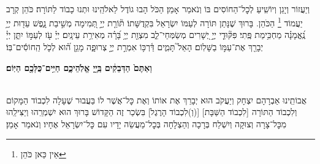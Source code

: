 \documentclass[twoside, openany, parskip=half, 11pt]{book}
\begin{document}
\avharachamim

\\
וְיַעֲזוֹר וְיָגֵן וְיוֹשִֽׁיעַ לְכׇל־הַחוֹסִים בּוֹ וְנֹאמַר אָמֵן׃
הַכֹּל הָבוּ גוֹדֶל לֵאלֹהֵֽינוּ וּתְנוּ כָבוֹד לַתּוֹרָה׃ כֹּהֵן קְרָב יַעֲמוֹד
\footnote{ אֵין כַּאן כֹּהֵן}
הַכֹּהֵן. בָּרוּךְ שֶׁנָּתַן תּוֹרָה לְעַמּוֹ יִשְׂרָאֵל בִּקְדֻשָּׁתוֹ׃
תּ֘וֹרַ֤ת יְיָ֣ תְּ֭מִימָה מְשִׁ֣יבַת נָ֑פֶשׁ עֵד֖וּת יְיָ֥ נֶֽ֝אֱמָנָ֗ה מַחְכִּ֥ימַת פֶּֽתִי׃ פִּקּ֘וּדֵ֤י יְיָ֣ יְ֭שָׁרִים מְשַׂמְּחֵי־לֵ֑ב מִצְוַ֖ת יְיָ֥ בָּ֝רָ֗ה מְאִירַ֥ת עֵינָֽיִם׃
יְיָ֗ עֹ֖ז לְעַמּ֣וֹ יִתֵּ֑ן יְיָ֓ יְבָרֵ֖ךְ אֶת־עַמּ֣וֹ בַשָּׁלֽוֹם׃
הָאֵל֮ תָּמִ֢ים דַּ֫רְכּ֥וֹ אִמְרַ֣ת יְיָ֣ צְרוּפָ֑ה מָגֵ֥ן ה֝֗וּא לְכֹ֤ל הַֽחוֹסִ֬ים־בּֽוֹ׃


\textbf{וְאַתֶּם֙ הַדְּבֵקִ֔ים בַּֽיְ֖יָ אֱלֹֽהֵיכֶ֑ם חַיִּ֥ים־כֻּלְּכֶ֖ם הַיּֽוֹם׃} 

\nextpage

\torahbarachu

\hagomel

\\
אֲבוֹתֵֽינוּ אַבְרָהָם יִצְחָק וְיַעֲקֹב הוּא יְבָרֵךְ אֶת
אוֹתוֹ וְאֶת כׇּל־אֲשֶׁר לוֹ
בַּעֲבוּר שֶׁעָלָה לִכְבוֹד הַמָּקוֹם וְלִכְבוֹד הַתּוֹרָה
[לִכְבוֹד הַשַּׁבָּת]
[(וְ)לִכְבוֹד הָרֶגֶל]
בִּשְׂכַר זֶה הַקָּדוֹשׁ בָּרוּךְ הוּא יִשְׁמְרֵֽהוּ וְיַצִּילֵֽהוּ מִכׇּל־צָרָה וְצוּקָה וְיִשְׁלַח בְּרָכָה וְהַצְלָחָה בְּכׇל־מַעֲשֵׂה יָדָיו עִם כׇּל־יִשְׂרָאֵל אֶחָיו׃ וְנֹאמַר אָמֵן׃
\end{document}
